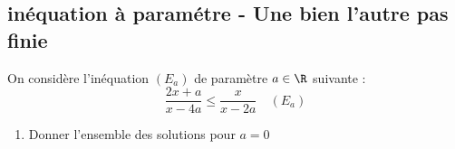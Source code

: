 \begin{correction}
\begin{correction}
\begin{enumerate}
\end{enumerate}










\end{correction}































\subsection{inéquation à paramétre - Une bien l'autre pas finie}

\begin{exercice}
On considère l'inéquation $(E_a)$ de paramètre $a\in \R$ suivante  :
$$ \frac{2x+a}{x-4a}  \leq \frac{x}{x-2a} \quad (E_a)$$

\begin{enumerate}
\item Donner l'ensemble des solutions pour $a=0$\\


\end{enumerate}
\end{exercice}
\end{correction}
